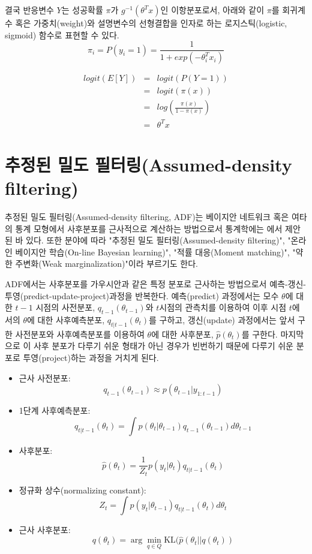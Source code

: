 \documentclass[oneside,b5paper,11pt]{book} %
\begin{document}
결국 반응변수 $Y$는 성공확률 $\pi$가 $g^{-1}(\theta^T x)$인 이항분포로서, 아래와 같이 $\pi$를 회귀계수 혹은 가중치(weight)와 설명변수의 선형결합을 인자로 하는 로지스틱(logistic, sigmoid) 함수로 표현할 수 있다.
$$
\pi_i = P(y_i=1) = \frac{1}{1+exp(-\theta_i^T x_i)}
$$

\begin{eqnarray}
    {}logit(E[Y])  
  &=& logit(P(Y=1))  \\
  &=& logit(\pi(x))  \\  
  &=& log \left( \frac{\pi(x)}{1-\pi(x)}\right) \\
  &=& \theta^T x
\end{eqnarray}


\section{추정된 밀도 필터링(Assumed-density filtering)}
 추정된 밀도 필터링(Assumed-density filtering, ADF)는 베이지안 네트워크 혹은 여타의 통계 모형에서 사후분포를 근사적으로 계산하는 방법으로서 통계학에는 \citet{Lauritzen1992}에서 제안된 바 있다. 또한 분야에 따라 "추정된 밀도 필터링(Assumed-density filtering)", "온라인 베이지안 학습(On-line Bayesian learning)", "적률 대응(Moment matching)", "약한 주변화(Weak marginalization)"이라 부르기도 한다. \citep{Minka2013}

 ADF에서는 사후분포를 가우시안과 같은 특정 분포로 근사하는 방법으로서 예측-갱신-투영(predict-update-project)과정을 반복한다. 예측(predict) 과정에서는 모수 $\theta$에 대한 $t-1$ 시점의 사전분포, $q_{t-1}(\theta_{t-1})$와 $t$시점의 관측치를 이용하여 이후 시점 $t$에서의 $\theta$에 대한 사후예측분포, $q_{t|t-1}(\theta_{t})$를 구하고, 갱신(update) 과정에서는 앞서 구한 사전분포와 사후예측분포를 이용하여 $\theta$에 대한 사후분포, $\hat{p}(\theta_t)$를 구한다. 마지막으로 이 사후 분포가 다루기 쉬운 형태가 아닌 경우가 빈번하기 때문에 다루기 쉬운 분포로 투영(project)하는 과정을 거치게 된다.

\begin{itemize}
\item 근사 사전분포: 
$$q_{t-1}(\theta_{t-1}) \approx p(\theta_{t-1}|y_{1:t-1})$$
\item 1단계 사후예측분포: 
$$q_{t|t-1}(\theta_t) = \int p(\theta_t | \theta_{t-1}) q_{t-1}(\theta_{t-1}) d\theta_{t-1}$$
\item 사후분포:
$$\hat{p}(\theta_t) = \frac{1}{Z_t}p(y_t | \theta_t)q_{t|t-1}(\theta_t)$$
\item 정규화 상수(normalizing constant):
$$Z_t = \int p(y_t | \theta_{t-1})q_{t|t-1}(\theta_{t})d\theta_{t}$$
\item 근사 사후분포:
$$q(\theta_t) = \arg\min_{q \in Q} \mathrm{KL}(\hat{p}(\theta_t || q(\theta_t)) $$
\end{itemize}
\end{document}
